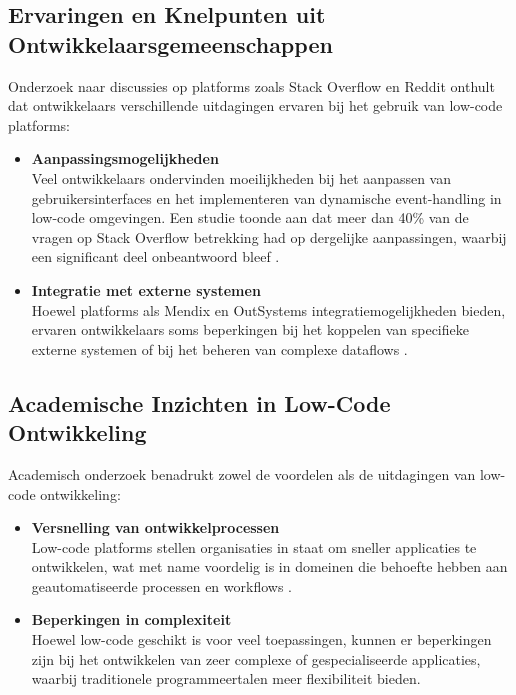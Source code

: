 \subsection{Ervaringen en Knelpunten uit Ontwikkelaarsgemeenschappen}
Onderzoek naar discussies op platforms zoals Stack Overflow en Reddit onthult dat ontwikkelaars verschillende uitdagingen ervaren bij het gebruik van low-code platforms:
\begin{itemize}
    \item \textbf{Aanpassingsmogelijkheden}
    \\
    Veel ontwikkelaars ondervinden moeilijkheden bij het aanpassen van gebruikersinterfaces en het implementeren van dynamische event-handling in low-code omgevingen. Een studie toonde aan dat meer dan 40\% van de vragen op Stack Overflow betrekking had op dergelijke aanpassingen, waarbij een significant deel onbeantwoord bleef \autocite{Alamin2021}.
    \item \textbf{Integratie met externe systemen}
    \\
    Hoewel platforms als Mendix en OutSystems integratiemogelijkheden bieden, ervaren ontwikkelaars soms beperkingen bij het koppelen van specifieke externe systemen of bij het beheren van complexe dataflows \autocite{Gadia2025}.
\end{itemize}
\subsection{Academische Inzichten in Low-Code Ontwikkeling}
Academisch onderzoek benadrukt zowel de voordelen als de uitdagingen van low-code ontwikkeling:
\begin{itemize}
    \item \textbf{Versnelling van ontwikkelprocessen}
    \\
    Low-code platforms stellen organisaties in staat om sneller applicaties te ontwikkelen, wat met name voordelig is in domeinen die behoefte hebben aan geautomatiseerde processen en workflows \autocite{Luo2021}.
    \item \textbf{Beperkingen in complexiteit}
    \\
    Hoewel low-code geschikt is voor veel toepassingen, kunnen er beperkingen zijn bij het ontwikkelen van zeer complexe of gespecialiseerde applicaties, waarbij traditionele programmeertalen meer flexibiliteit bieden.
\end{itemize}

